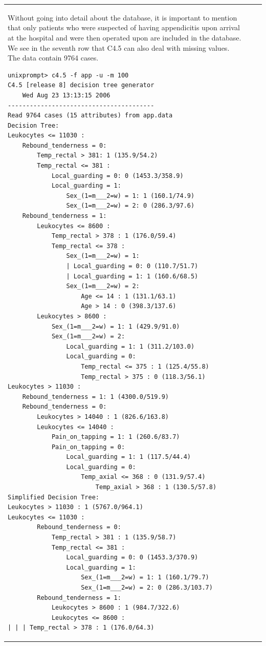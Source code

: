 \documentclass[10pt]{book}
\begin{document}
\begin{center}
\begin{tabular}{|l|l|l|}
Without going into detail about the database, it is important to mention that only patients who were suspected of having appendicitis upon arrival at the hospital and were then operated upon are included in the database. We see in the seventh row that C4.5 can also deal with missing values. The data contain 9764 cases.
\begin{verbatim}
unixprompt> c4.5 -f app -u -m 100
C4.5 [release 8] decision tree generator
    Wed Aug 23 13:13:15 2006
----------------------------------------
Read 9764 cases (15 attributes) from app.data
Decision Tree:
Leukocytes <= 11030 :
    Rebound_tenderness = 0:
        Temp_rectal > 381: 1 (135.9/54.2)
        Temp_rectal <= 381 :
            Local_guarding = 0: 0 (1453.3/358.9)
            Local_guarding = 1:
                Sex_(1=m___2=w) = 1: 1 (160.1/74.9)
                Sex_(1=m___2=w) = 2: 0 (286.3/97.6)
    Rebound_tenderness = 1:
        Leukocytes <= 8600 :
            Temp_rectal > 378 : 1 (176.0/59.4)
            Temp_rectal <= 378 :
                Sex_(1=m___2=w) = 1:
                | Local_guarding = 0: 0 (110.7/51.7)
                | Local_guarding = 1: 1 (160.6/68.5)
                Sex_(1=m___2=w) = 2:
                    Age <= 14 : 1 (131.1/63.1)
                    Age > 14 : 0 (398.3/137.6)
        Leukocytes > 8600 :
            Sex_(1=m___2=w) = 1: 1 (429.9/91.0)
            Sex_(1=m___2=w) = 2:
                Local_guarding = 1: 1 (311.2/103.0)
                Local_guarding = 0:
                    Temp_rectal <= 375 : 1 (125.4/55.8)
                    Temp_rectal > 375 : 0 (118.3/56.1)
Leukocytes > 11030 :
    Rebound_tenderness = 1: 1 (4300.0/519.9)
    Rebound_tenderness = 0:
        Leukocytes > 14040 : 1 (826.6/163.8)
        Leukocytes <= 14040 :
            Pain_on_tapping = 1: 1 (260.6/83.7)
            Pain_on_tapping = 0:
                Local_guarding = 1: 1 (117.5/44.4)
                Local_guarding = 0:
                    Temp_axial <= 368 : 0 (131.9/57.4)
                        Temp_axial > 368 : 1 (130.5/57.8)
Simplified Decision Tree:
Leukocytes > 11030 : 1 (5767.0/964.1)
Leukocytes <= 11030 :
        Rebound_tenderness = 0:
            Temp_rectal > 381 : 1 (135.9/58.7)
            Temp_rectal <= 381 :
                Local_guarding = 0: 0 (1453.3/370.9)
                Local_guarding = 1:
                    Sex_(1=m___2=w) = 1: 1 (160.1/79.7)
                    Sex_(1=m___2=w) = 2: 0 (286.3/103.7)
        Rebound_tenderness = 1:
            Leukocytes > 8600 : 1 (984.7/322.6)
            Leukocytes <= 8600 :
| | | Temp_rectal > 378 : 1 (176.0/64.3)

\end{verbatim}
\end{tabular}
\end{center}
\end{document}
